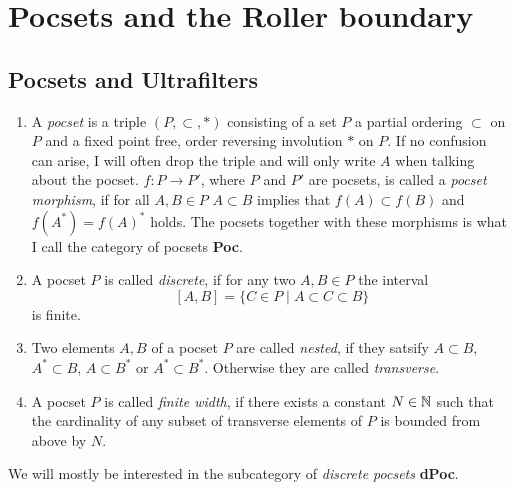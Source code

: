 \section{Pocsets and the Roller boundary}
\label{sec:roller}

\subsection{Pocsets and Ultrafilters}
\label{sec:pocset}

\begin{defin}
  \begin{enumerate}
  \item A \emph{pocset} is a triple \((P, \subset, \ast)\) consisting of a set \(P\) a partial ordering \(\subset\) on \(P\) and a fixed point free, order reversing involution \(\ast\) on \(P\). If no confusion can arise, I will often drop the triple and will only write \(A\) when talking about the pocset. \(f \colon P \to P'\), where \(P\) and \(P'\) are pocsets, is called a \emph{pocset morphism}, if for all \(A, B \in P\) \(A \subset B\) implies that \(f(A) \subset f(B)\) and \(f(A^\ast) = f(A)^\ast\) holds. The pocsets together with these morphisms is what I call the category of pocsets {\textbf{Poc}}.
  \item A pocset \(P\) is called \emph{discrete}, if for any two \(A, B \in P\) the interval
    \[
      [A,B] = \{C \in P \mid A \subset C \subset B\}
    \]
    is finite.
  \item Two elements \(A,B\) of a pocset \(P\) are called \emph{nested}, if they satsify \(A \subset B\), \(A^\ast \subset B\), \(A \subset B^\ast\) or \(A^\ast \subset B^\ast\). Otherwise they are called \emph{transverse}.
  \item A pocset \(P\) is called \emph{finite width}, if there exists a constant \(N \in \mathbb{N}\) such that the cardinality of any subset of transverse elements of \(P\) is bounded from above by \(N\).
  \end{enumerate}
  We will mostly be interested in the subcategory of \emph{discrete pocsets} \textbf{dPoc}.
\end{defin}

